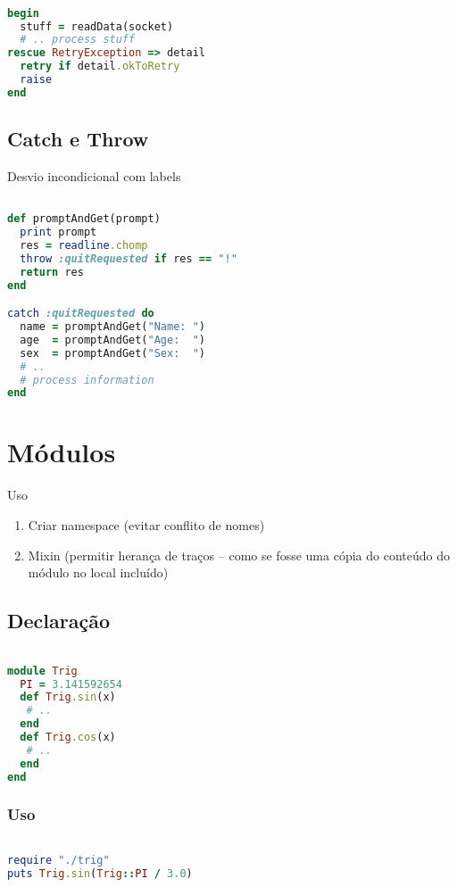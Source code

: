 \documentclass[serif,mathserif]{article}
\begin{document}
\begin{lstlisting}[language=ruby]

begin
  stuff = readData(socket)
  # .. process stuff
rescue RetryException => detail
  retry if detail.okToRetry
  raise
end
\end{lstlisting}

\subsection{Catch e Throw}

Desvio incondicional com labels

\begin{lstlisting}[language=ruby]

def promptAndGet(prompt)
  print prompt
  res = readline.chomp
  throw :quitRequested if res == "!"
  return res
end

catch :quitRequested do
  name = promptAndGet("Name: ")
  age  = promptAndGet("Age:  ")
  sex  = promptAndGet("Sex:  ")
  # ..
  # process information
end
\end{lstlisting}

\section{Módulos}
Uso

\begin{enumerate}
  \item Criar namespace (evitar conflito de nomes)
  \item Mixin (permitir herança de traços – como se fosse uma cópia do conteúdo do módulo no local incluído)
\end{enumerate}

\subsection{Declaração}

\begin{lstlisting}[language=ruby]

module Trig
  PI = 3.141592654
  def Trig.sin(x)
   # ..
  end
  def Trig.cos(x)
   # ..
  end
end
\end{lstlisting}

\subsubsection{Uso}

\begin{lstlisting}[language=ruby]

require "./trig"
puts Trig.sin(Trig::PI / 3.0)
\end{lstlisting}
\end{document}
